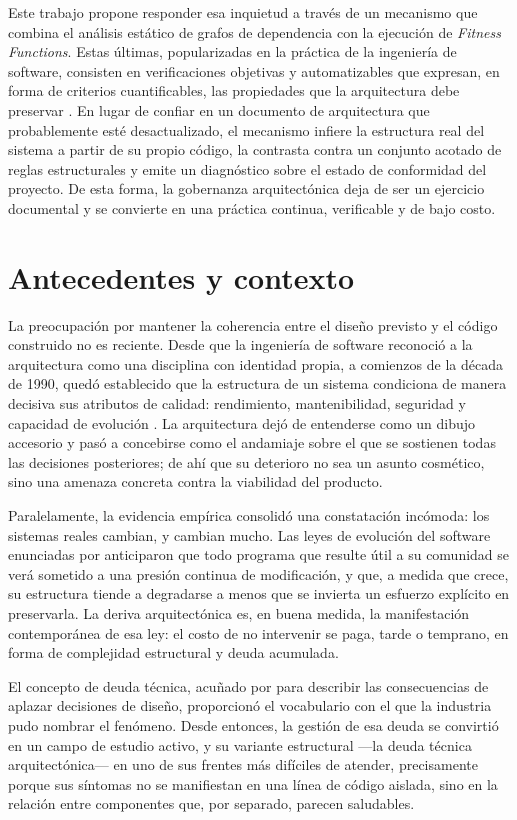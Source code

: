 Este trabajo propone responder esa inquietud a través de un mecanismo que combina el análisis estático de grafos de dependencia con la ejecución de \textit{Fitness Functions}. Estas últimas, popularizadas en la práctica de la ingeniería de software, consisten en verificaciones objetivas y automatizables que expresan, en forma de criterios cuantificables, las propiedades que la arquitectura debe preservar \citep{PaulWang2019, FordParsonsKua2017, Ford2022}. En lugar de confiar en un documento de arquitectura que probablemente esté desactualizado, el mecanismo infiere la estructura real del sistema a partir de su propio código, la contrasta contra un conjunto acotado de reglas estructurales y emite un diagnóstico sobre el estado de conformidad del proyecto. De esta forma, la gobernanza arquitectónica deja de ser un ejercicio documental y se convierte en una práctica continua, verificable y de bajo costo.

\section{Antecedentes y contexto}
La preocupación por mantener la coherencia entre el diseño previsto y el código construido no es reciente. Desde que la ingeniería de software reconoció a la arquitectura como una disciplina con identidad propia, a comienzos de la década de 1990, quedó establecido que la estructura de un sistema condiciona de manera decisiva sus atributos de calidad: rendimiento, mantenibilidad, seguridad y capacidad de evolución \citep{PerryWolf1992, Bass2012}. La arquitectura dejó de entenderse como un dibujo accesorio y pasó a concebirse como el andamiaje sobre el que se sostienen todas las decisiones posteriores; de ahí que su deterioro no sea un asunto cosmético, sino una amenaza concreta contra la viabilidad del producto.

Paralelamente, la evidencia empírica consolidó una constatación incómoda: los sistemas reales cambian, y cambian mucho. Las leyes de evolución del software enunciadas por \citet{Lehman1980} anticiparon que todo programa que resulte útil a su comunidad se verá sometido a una presión continua de modificación, y que, a medida que crece, su estructura tiende a degradarse a menos que se invierta un esfuerzo explícito en preservarla. La deriva arquitectónica es, en buena medida, la manifestación contemporánea de esa ley: el costo de no intervenir se paga, tarde o temprano, en forma de complejidad estructural y deuda acumulada.

El concepto de deuda técnica, acuñado por \citet{Cunningham1992} para describir las consecuencias de aplazar decisiones de diseño, proporcionó el vocabulario con el que la industria pudo nombrar el fenómeno. Desde entonces, la gestión de esa deuda se convirtió en un campo de estudio activo, y su variante estructural —la deuda técnica arquitectónica— en uno de sus frentes más difíciles de atender, precisamente porque sus síntomas no se manifiestan en una línea de código aislada, sino en la relación entre componentes que, por separado, parecen saludables.

